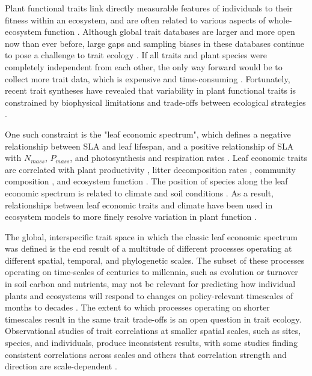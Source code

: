 \documentclass{article}
\begin{document}
Plant functional traits link directly measurable features of individuals to their fitness within an ecosystem, and are often related to various aspects of whole-ecosystem function \citep{violle_2007_let,cardinale_2012_biodiversity}.
Although global trait databases are larger and more open now than ever before, large gaps and sampling biases in these databases continue to pose a challenge to trait ecology \citep{cornwell_2019_what}.
If all traits and plant species were completely independent from each other, the only way forward would be to collect more trait data, which is expensive and time-consuming \citep{cornwell_2019_what}.
Fortunately, recent trait syntheses have revealed that variability in plant functional traits is constrained by biophysical limitations and trade-offs between ecological strategies \citep{kattge_2011_try,wright_2004_worldwide,kleyer_2015_why,diaz_2015_global}.

One such constraint is the "leaf economic spectrum", which defines a negative relationship between SLA and leaf lifespan, and a positive relationship of SLA with $N_{mass}$, $P_{mass}$, and photosynthesis and respiration rates \citep{wright_2004_worldwide,shipley_2006_fundamental,reich_2014_world,diaz_2015_global}.
Leaf economic traits are correlated with
plant productivity \citep{shipley_2005_functional,niinemets_2016_within,wu_2016_convergence},
litter decomposition rates \citep{bakker_2010_leaf,hobbie_2015_plant},
community composition \citep{burns_2004_patterns,cavender-bares_2004_multiple},
and ecosystem function \citep{diaz_2004_plant,musavi_2015_imprint}.
The position of species along the leaf economic spectrum is related to climate and soil conditions
\citep{wright_2004_worldwide,wright_2005_modulation,cornwell_2009_community,ordonez_2009_global,wigley_2016_leaf}.
As a result, relationships between leaf economic traits and climate have been used in ecosystem models to more finely resolve variation in plant function \citep{sakschewski_2015_leaf,verheijen_2015_inclusion,scheiter_2013_next}.

The global, interspecific trait space in which the classic leaf economic spectrum was defined is the end result of a multitude of different processes operating at different spatial, temporal, and phylogenetic scales.
The subset of these processes operating on time-scales of centuries to millennia, such as evolution or turnover in soil carbon and nutrients,
may not be relevant for predicting how individual plants and ecosystems will respond to changes on policy-relevant timescales of months to decades \citep{shaw_2012_rapid}.
The extent to which processes operating on shorter timescales result in the same trait trade-offs is an open question in trait ecology.
Observational studies of trait correlations at smaller spatial scales, such as sites, species, and individuals, produce inconsistent results,
with some studies finding consistent correlations across scales \citep{wright_2004_worldwide,albert_2010_multi,asner_2014_amazonian}
and others that correlation strength and direction are scale-dependent  \citep{albert_2010_intraspecific_functional_variability,messier_2010_how,wright_2012_does,feng_2013_scale,grubb_2015_relationships,wigley_2016_leaf,messier_2017_interspecific,kichenin_2013_contrasting}.
\end{document}
